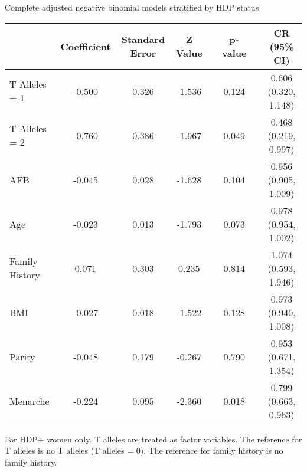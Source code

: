 \documentclass{standalone}
\begin{document}
\begin{threeparttable}
\caption{Complete adjusted negative binomial models stratified by HDP status}
\begin{tabular}{@{}lccccccc@{}}
  \toprule
 & Coefficient & Standard Error & Z Value & \hspace{1em} & p-value & \hspace{1em} & CR (95\% CI) \\ 
  \midrule
  T Alleles = 1\phantom{hdpxx} & -0.500 & 0.326 & -1.536 && 0.124 && 0.606 (0.320, 1.148) \\ 
  T Alleles = 2 & -0.760 & 0.386 & -1.967 && 0.049 && 0.468 (0.219, 0.997) \\ 
  AFB & -0.045 & 0.028 & -1.628 && 0.104 && 0.956 (0.905, 1.009) \\ 
  Age & -0.023 & 0.013 & -1.793 && 0.073 && 0.978 (0.954, 1.002) \\ 
  Family History & 0.071 & 0.303 & 0.235 && 0.814 && 1.074 (0.593, 1.946) \\ 
  BMI & -0.027 & 0.018 & -1.522 && 0.128 && 0.973 (0.940, 1.008) \\ 
  Parity & -0.048 & 0.179 & -0.267 && 0.790 && 0.953 (0.671, 1.354) \\ 
  Menarche & -0.224 & 0.095 & -2.360 && 0.018 && 0.799 (0.663, 0.963) \\ 
   \bottomrule
\end{tabular}
\begin{tablenotes}
\small
\item For HDP+ women only. T alleles are treated as factor variables. The reference for T alleles is no T alleles (T alleles = 0). The reference for family history is no family history.
\end{tablenotes}
\end{threeparttable}
\end{document}
